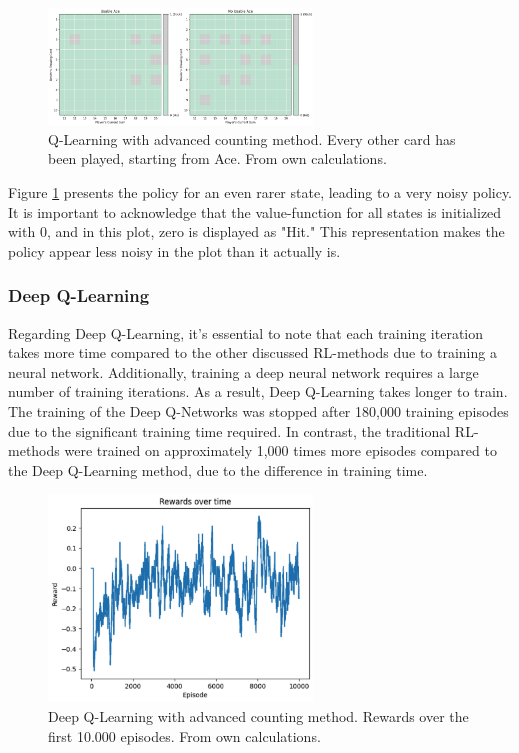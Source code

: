 \documentclass[conference]{IEEEtran}
\begin{document}
\begin{figure}
	\centering
	\includegraphics[width=70mm]{figures/Q-Learning/advanced-counting-10-million/policy-some-cards-played-1010101010.png}
	\caption{Q-Learning with advanced counting method. Every other card has been played, starting from Ace. From own calculations.}
	\label{fig:q-learning-advanced-every-other}
\end{figure}

Figure \ref{fig:q-learning-advanced-every-other} presents the policy for an even rarer state, leading to a very noisy policy. It is important to acknowledge that the value-function for all states is initialized with 0, and in this plot, zero is displayed as "Hit." This representation makes the policy appear less noisy in the plot than it actually is.


\subsubsection{Deep Q-Learning}
Regarding Deep Q-Learning, it's essential to note that each training iteration takes more time compared to the other discussed RL-methods due to training a neural network. Additionally, training a deep neural network requires a large number of training iterations. As a result, Deep Q-Learning takes longer to train. The training of the Deep Q-Networks was stopped after 180,000 training episodes due to the significant training time required. In contrast, the traditional RL-methods were trained on approximately 1,000 times more episodes compared to the Deep Q-Learning method, due to the difference in training time.

\begin{figure}
	\centering
	\includegraphics[width=70mm]{figures/DQN/rewards_over_time_10000.png}
	\caption{Deep Q-Learning with advanced counting method. Rewards over the first 10.000 episodes. From own calculations.}
	\label{fig:dqn-rewards-over-time}
\end{figure}
\end{document}
